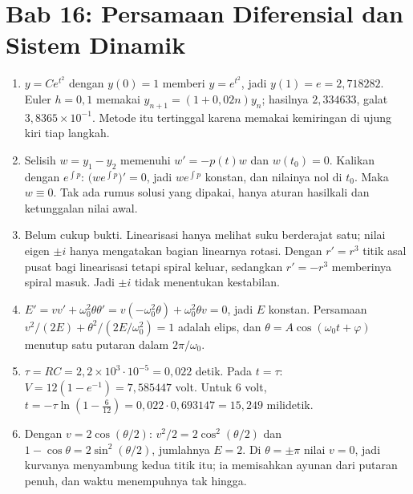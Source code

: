 
\section*{Bab 16: Persamaan Diferensial dan Sistem Dinamik}
\begin{enumerate}[label=\textbf{16.\arabic*}]
  \item $y=Ce^{t^{2}}$ dengan $y(0)=1$ memberi $y=e^{t^{2}}$, jadi $y(1)=e=2{,}718282$.
        Euler $h=0{,}1$ memakai $y_{n+1}=(1+0{,}02n)y_{n}$; hasilnya $2{,}334633$,
        galat $3{,}8365\times10^{-1}$. Metode itu tertinggal karena memakai
        kemiringan di ujung kiri tiap langkah.

  \item Selisih $w=y_{1}-y_{2}$ memenuhi $w'=-p(t)w$ dan $w(t_{0})=0$. Kalikan dengan
        $e^{\int p}$: $\bigl(we^{\int p}\bigr)'=0$, jadi $we^{\int p}$ konstan, dan
        nilainya nol di $t_{0}$. Maka $w\equiv0$. Tak ada rumus solusi yang dipakai,
        hanya aturan hasilkali dan ketunggalan nilai awal.

  \item Belum cukup bukti. Linearisasi hanya melihat suku berderajat satu; nilai eigen
        $\pm i$ hanya mengatakan bagian linearnya rotasi. Dengan $r'=r^{3}$ titik asal
        pusat bagi linearisasi tetapi spiral keluar, sedangkan $r'=-r^{3}$ memberinya
        spiral masuk. Jadi $\pm i$ tidak menentukan kestabilan.

  \item $E'=vv'+\omega_{0}^{2}\theta\theta'=v(-\omega_{0}^{2}\theta)+\omega_{0}^{2}\theta
        v=0$, jadi $E$ konstan. Persamaan $v^{2}/(2E)+\theta^{2}/(2E/\omega_{0}^{2})=1$
        adalah elips, dan $\theta=A\cos(\omega_{0}t+\varphi)$ menutup satu putaran
        dalam $2\pi/\omega_{0}$.

  \item $\tau=RC=2{,}2\times10^{3}\cdot10^{-5}=0{,}022$ detik. Pada $t=\tau$:
        $V=12(1-e^{-1})=7{,}585447$ volt. Untuk $6$ volt, $t=-\tau\ln(1-\tfrac{6}{12})
        =0{,}022\cdot0{,}693147=15{,}249$ milidetik.

  \item Dengan $v=2\cos(\theta/2)$: $v^{2}/2=2\cos^{2}(\theta/2)$ dan
        $1-\cos\theta=2\sin^{2}(\theta/2)$, jumlahnya $E=2$. Di $\theta=\pm\pi$ nilai
        $v=0$, jadi kurvanya menyambung kedua titik itu; ia memisahkan ayunan
        dari putaran penuh, dan waktu menempuhnya tak hingga.


\end{enumerate}
